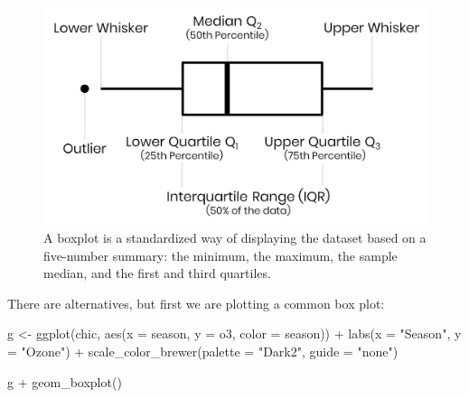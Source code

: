 \documentclass[
]{krantz}
\makeatletter
\newenvironment{Shaded}{\begin{snugshade}}{\end{snugshade}}
\newcommand{\AttributeTok}[1]{\textcolor[rgb]{0.61,0.61,0.61}{#1}}
\newcommand{\FunctionTok}[1]{\textcolor[rgb]{0,0,0}{#1}}
\newcommand{\NormalTok}[1]{#1}
\newcommand{\OtherTok}[1]{\textcolor[rgb]{0.37,0.37,0.37}{#1}}
\newcommand{\SpecialCharTok}[1]{\textcolor[rgb]{0,0,0}{#1}}
\newcommand{\StringTok}[1]{\textcolor[rgb]{0.5,0.5,0.5}{#1}}
\newenvironment{kframe}{%
\medskip{}
\setlength{\fboxsep}{.8em}
 \def\at@end@of@kframe{}%
 \ifinner\ifhmode%
  \def\at@end@of@kframe{\end{minipage}}%
  \begin{minipage}{\columnwidth}%
 \fi\fi%
 \def\FrameCommand##1{\hskip\@totalleftmargin \hskip-\fboxsep
 \colorbox{shadecolor}{##1}\hskip-\fboxsep
     \hskip-\linewidth \hskip-\@totalleftmargin \hskip\columnwidth}%
 \MakeFramed {\advance\hsize-\width
   \@totalleftmargin\z@ \linewidth\hsize
   \@setminipage}}%
 {\par\unskip\endMakeFramed%
 \at@end@of@kframe}
\renewenvironment{Shaded}{\begin{kframe}}{\end{kframe}}
\makeatother
\begin{document}
\begin{figure}
\includegraphics[width=1\linewidth]{img/boxplot} \caption{A boxplot is a standardized way of displaying the dataset based on a five-number summary: the minimum, the maximum, the sample median, and the first and third quartiles.}\label{fig:img-boxplot}
\end{figure}

There are alternatives, but first we are plotting a common box plot:

\begin{Shaded}
\begin{Highlighting}[]
\NormalTok{g }\OtherTok{\textless{}{-}}
  \FunctionTok{ggplot}\NormalTok{(chic, }\FunctionTok{aes}\NormalTok{(}\AttributeTok{x =}\NormalTok{ season, }\AttributeTok{y =}\NormalTok{ o3,}
                   \AttributeTok{color =}\NormalTok{ season)) }\SpecialCharTok{+}
    \FunctionTok{labs}\NormalTok{(}\AttributeTok{x =} \StringTok{"Season"}\NormalTok{, }\AttributeTok{y =} \StringTok{"Ozone"}\NormalTok{) }\SpecialCharTok{+}
    \FunctionTok{scale\_color\_brewer}\NormalTok{(}\AttributeTok{palette =} \StringTok{"Dark2"}\NormalTok{, }\AttributeTok{guide =} \StringTok{"none"}\NormalTok{)}

\NormalTok{g }\SpecialCharTok{+} \FunctionTok{geom\_boxplot}\NormalTok{()}
\end{Highlighting}
\end{Shaded}
\end{document}
